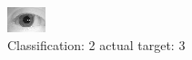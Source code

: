 \begin{figure}[h!]
\begin{center}
\includegraphics[width=0.60\columnwidth]{figures/ID1057_class_2_target_3.png}
\end{center}
\caption{ Classification: 2 actual target: 3}
\label{fig:ID1057_class_2_target_3}
\end{figure}
